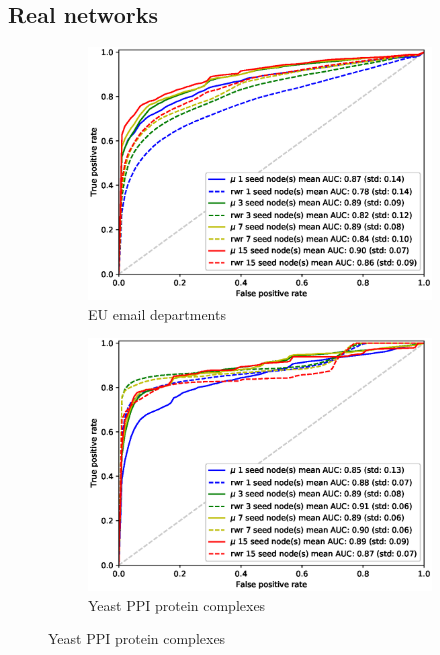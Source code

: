 \documentclass[sigconf]{acmart}
\begin{document}
\subsection{Real networks}
\label{sec:real_networks}

\begin{figure}
     \centering
    \begin{subfigure}[b]{0.45\textwidth}
        \centering
        \includegraphics[width=\textwidth]{images/rocs/eu_email.eps}
        \caption{EU email departments}
    \end{subfigure}
    \begin{subfigure}[b]{0.45\textwidth}
        \centering
        \includegraphics[width=\textwidth]{images/rocs/yeast_ppi.eps}
        \caption{Yeast PPI protein complexes}
    \end{subfigure}
    

\end{figure}
\end{document}
